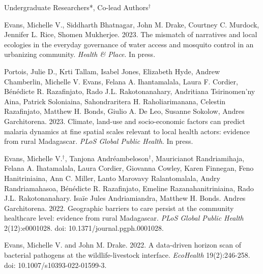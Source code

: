 


\bigskip
Undergraduate Researchers*, Co-lead Authors$^\dagger$

\smallskip

\begin{etaremune}

\item \textcolor{awesome}{Evans, Michelle V.}, Siddharth Bhatnagar, John M. Drake, Courtney C. Murdock, Jennifer L. Rice, Shomen Mukherjee. 2023. The mismatch of narratives and local ecologies in the everyday governance of water access and mosquito control in an urbanizing community. \textit{Health \& Place}. In press. \smallskip

\item Portois, Julie D., Krti Tallam, Isabel Jones, Elizabeth Hyde, Andrew Chamberlin, \textcolor{awesome}{Michelle V. Evans}, Felana A. Ihantamalala, Laura F. Cordier, B\'{e}n\'{e}dicte R. Razafinjato, Rado J.L. Rakotonanahary, Andritiana Tsirinomen'ny Aina, Patrick Soloniaina, Sahondraritera H. Raholiarimanana, Celestin Razafinjato, Matthew H. Bonds, Giulio A. De Leo, Susanne Sokolow, Andres Garchitorena. 2023. Climate, land-use and socio-economic factors can predict malaria dynamics at fine spatial scales relevant to local health actors: evidence from rural Madagascar. \textit{PLoS Global Public Health}. In press. \smallskip

\item \textcolor{awesome}{Evans, Michelle V.}$^\dagger$, Tanjona Andr\'{e}ambeloson$^\dagger$, Mauricianot Randriamihaja, Felana A. Ihatamalala, Laura Cordier, Giovanna Cowley, Karen Finnegan, Feno Hanitriniaina, Ann C. Miller, Lanto Marovavy Ralantomalala, Andry Randriamahasoa, B\'{e}n\'{e}dicte R. Razafinjato, Emeline Razanahanitriniaina, Rado J.L. Rakotonanahary. Isa\"{i}e Jules Andriamiandra, Matthew H. Bonds. Andres Garchitorena. 2022. Geographic barriers to care persist at the community healthcare level: evidence from rural Madagascar. \textit{PLoS Global Public Health} 2(12):e0001028. doi: 10.1371/journal.pgph.0001028. \smallskip

\item \textcolor{awesome}{Evans, Michelle V.} and John M. Drake. 2022. A data-driven horizon scan of bacterial pathogens at the wildlife-livestock interface. \textit{EcoHealth} 19(2):246-258. doi: 10.1007/s10393-022-01599-3. \smallskip


\end{etaremune}
